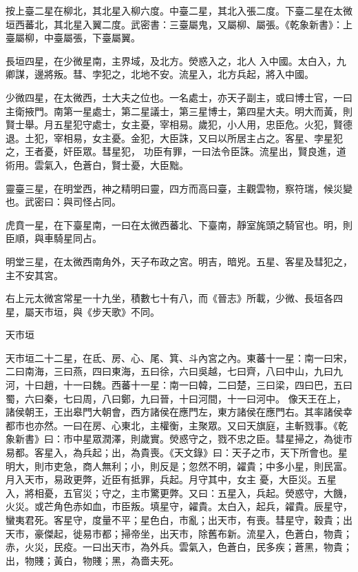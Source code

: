 \begin{pinyinscope}
 按上臺二星在柳北，其北星入柳六度。中臺二星，其北入張二度。下臺二星在太微垣西蕃北，其北星入翼二度。武密書：三臺屬鬼，又屬柳、屬張。《乾象新書》：上臺屬柳，中臺屬張，下臺屬翼。



 長垣四星，在少微星南，主界域，及北方。熒惑入之，北人
 入中國。太白入，九卿謀，邊將叛。彗、孛犯之，北地不安。流星入，北方兵起，將入中國。



 少微四星，在太微西，士大夫之位也。一名處士，亦天子副主，或曰博士官，一曰主衛掖門。南第一星處士，第二星議士，第三星博士，第四星大夫。明大而黃，則賢士舉。月五星犯守處士，女主憂，宰相易。歲犯，小人用，忠臣危。火犯，賢德退。土犯，宰相易，女主憂。金犯，大臣誅，又曰以所居主占之。客星、孛星犯之，王者憂，奸臣眾。彗星犯，
 功臣有罪，一曰法令臣誅。流星出，賢良進，道術用。雲氣入，色蒼白，賢士憂，大臣黜。



 靈臺三星，在明堂西，神之精明曰靈，四方而高曰臺，主觀雲物，察符瑞，候災變也。武密曰：與司怪占同。



 虎賁一星，在下臺星南，一曰在太微西蕃北、下臺南，靜室旄頭之騎官也。明，則臣順，與車騎星同占。



 明堂三星，在太微西南角外，天子布政之宮。明吉，暗兇。五星、客星及彗犯之，主不安其宮。



 右上元太微宮常星一十九坐，積數七十有八，而《晉志》所載，少微、長垣各四星，屬天市垣，與《步天歌》不同。



 天市垣



 天市垣二十二星，在氐、房、心、尾、箕、斗內宮之內。東蕃十一星：南一曰宋，二曰南海，三曰燕，四曰東海，五曰徐，六曰吳越，七曰齊，八曰中山，九曰九河，十曰趙，十一曰魏。西蕃十一星：南一曰韓，二曰楚，三曰梁，四曰巴，五曰蜀，六曰秦，七曰周，八曰鄭，九曰晉，十曰河間，十一曰河中。
 像天王在上，諸侯朝王，王出皋門大朝會，西方諸侯在應門左，東方諸侯在應門右。其率諸侯幸都市也亦然。一曰在房、心東北，主權衡，主聚眾。又曰天旗庭，主斬戮事。《乾象新書》曰：市中星眾潤澤，則歲實。熒惑守之，戮不忠之臣。彗星掃之，為徙市易都。客星入，為兵起；出，為貴喪。《天文錄》曰：天子之市，天下所會也。星明大，則市吏急，商人無利；小，則反是；忽然不明，糴貴；中多小星，則民富。月入天市，易政更弊，近臣有抵罪，兵起。月守其中，女主
 憂，大臣災。五星入，將相憂，五官災；守之，主市驚更弊。又曰：五星入，兵起。熒惑守，大饑，火災。或芒角色赤如血，市臣叛。填星守，糴貴。太白入，起兵，糴貴。辰星守，蠻夷君死。客星守，度量不平；星色白，市亂；出天市，有喪。彗星守，穀貴；出天市，豪傑起，徙易市都；掃帝坐，出天市，除舊布新。流星入，色蒼白，物貴；赤，火災，民疫。一曰出天市，為外兵。雲氣入，色蒼白，民多疾；蒼黑，物貴；出，物賤；黃白，物賤；黑，為嗇夫死。




\end{pinyinscope}
